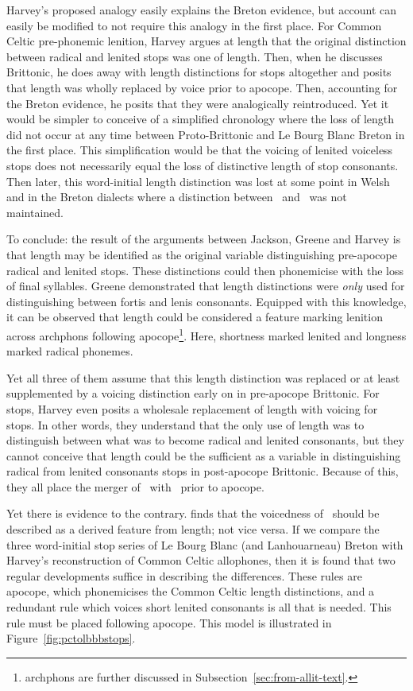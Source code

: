 Harvey's proposed analogy easily explains the Breton evidence, but account can easily be modified to not require this analogy in the first place. For Common Celtic pre-phonemic lenition, Harvey argues at length that the original distinction between radical and lenited stops was one of length. Then, when he discusses Brittonic, he does away with length distinctions for stops altogether and posits that length was wholly replaced by voice prior to apocope. Then, accounting for the Breton evidence, he posits that they were analogically reintroduced. Yet it would be simpler to conceive of a simplified chronology where the loss of length did not occur at any time between Proto-Brittonic and Le Bourg Blanc Breton in the first place. This simplification would be that the voicing of lenited voiceless stops does not necessarily equal the loss of distinctive length of stop consonants. Then later, this word-initial length distinction was lost at some point in Welsh and in the Breton dialects where a distinction between \lT\ and \xD\ was not maintained.

To conclude: the result of the arguments between Jackson, Greene and Harvey is that length may be identified as the original variable distinguishing pre-apocope radical and lenited stops. These distinctions could then phonemicise with the loss of final syllables. Greene demonstrated that length distinctions were \emph{only} used for distinguishing between fortis and lenis consonants. Equipped with this knowledge, it can be observed that length could be considered a feature marking lenition across \gls{archphon}s following apocope\footnote{\Gls{archphon}s are further discussed in Subsection~\ref{sec:from-allit-text}.}. Here, shortness marked lenited and longness marked radical phonemes.

Yet all three of them assume that this length distinction was replaced or at least supplemented by a voicing distinction early on in pre-apocope Brittonic. For stops, Harvey even posits a wholesale replacement of length with voicing for stops. In other words, they understand that the only use of length was to distinguish between what was to become radical and lenited consonants, but they cannot conceive that length could be the sufficient as a variable in distinguishing radical from lenited consonants stops in post-apocope Brittonic. Because of this, they all place the merger of \lT\ with \xD\ prior to apocope.

Yet there is evidence to the contrary. \Textcite{carlyle_syllabic_1988} finds that the voicedness of \lT\ should be described as a derived feature from length; not vice versa. If we compare the three word-initial stop series of Le Bourg Blanc (and Lanhouarneau) Breton with Harvey's reconstruction of Common Celtic allophones, then it is found that two regular developments suffice in describing the differences. These rules are apocope, which phonemicises the Common Celtic length distinctions, and a redundant rule which voices short \ie lenited consonants is all that is needed. This rule must be placed following apocope. This model is illustrated in Figure~\ref{fig:pctolbbbstops}.

